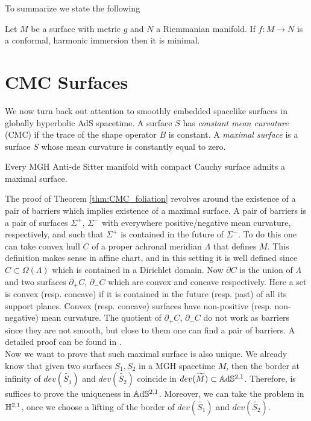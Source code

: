 To summarize we state the following
\begin{theorem}\label{thm:minimal}
    Let $M$ be a surface with metric $g$ and $N$ a Riemmanian manifold. If $f: M \to N$ is a conformal, harmonic immersion then it is minimal.
\end{theorem}

\section{CMC Surfaces}
We now turn back out attention to smoothly embedded spacelike surfaces in globally hyperbolic AdS spacetime. A surface $S$ has \textit{constant mean curvature} (CMC) if the trace of the shape operator $B$ is constant. A \textit{maximal surface} is a surface $S$ whose mean curvature is constantly equal to zero.
\begin{theorem}\label{thm:CMC_foliation}
    Every MGH Anti-de Sitter manifold with compact Cauchy surface admits a maximal surface.
\end{theorem}
The proof of Theorem \ref{thm:CMC_foliation} revolves around the existence of a pair of barriers which implies existence of a maximal surface. A pair of barriers is a pair of surfaces $\Sigma^+$, $\Sigma^-$ with everywhere positive/negative mean curvature, respectively, and such that $\Sigma^+$ is contained in the future of $\Sigma^-$.
To do this one can take convex hull $C$ of a proper achronal meridian $\Lambda$ that defines $M$. This definition makes sense in affine chart, and in this setting it is well defined since $C \subset \Omega(\Lambda)$ which is contained in a Dirichlet domain. Now $\partial C$ is the union of $\Lambda$ and two surfaces $\partial_+ C$, $\partial_- C$ which are convex and concave respectively. Here a set is convex (resp. concave) if it is contained in the future (resp. past) of all its support planes. Convex (resp. concave) surfaces have non-positive (resp. non-negative) mean curvature. The quotient of $\partial_+ C$, $\partial_- C$ do not work as barriers since they are not smooth, but close to them one can find a pair of barriers.
A detailed proof can be found in \cite{barbot2004constant}.\\
Now we want to prove that such maximal surface is also unique. We already know that given two surfaces $S_1, S_2$ in a MGH spacetime $M$, then the border at infinity of $dev(\widetilde{S_1})$ and $dev(\widetilde{S_2})$ coincide in $dev(\widetilde{M})\subset \mathbb{A}\mathrm{d}\mathbb{S}^{2,1}$. Therefore, is suffices to prove the uniqueness in $\mathbb{A}\mathrm{d}\mathbb{S}^{2,1}$. Moreover, we can take the problem in $\mathbb{H}^{2,1}$, once we choose a lifting of the border of $dev(\widetilde{S_1})$ and $dev(\widetilde{S_2})$.\\
